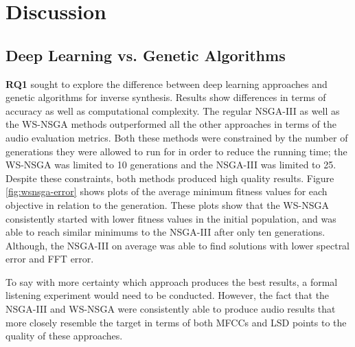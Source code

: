 \section{Discussion}
\label{sec:inverse-synth-discuss}

\subsection{Deep Learning vs. Genetic Algorithms}
\textbf{RQ1} sought to explore the difference between deep learning approaches and genetic algorithms for inverse synthesis. Results show differences in terms of accuracy as well as computational complexity. The regular NSGA-III as well as the WS-NSGA methods outperformed all the other approaches in terms of the audio evaluation metrics. Both these methods were constrained by the number of generations they were allowed to run for in order to reduce the running time; the WS-NSGA was limited to 10 generations and the NSGA-III was limited to 25. Despite these constraints, both methods produced high quality results. Figure \ref{fig:wsnsga-error} shows plots of the average minimum fitness values for each objective in relation to the generation. These plots show that the WS-NSGA consistently started with lower fitness values in the initial population, and was able to reach similar minimums to the NSGA-III after only ten generations. Although, the NSGA-III on average was able to find solutions with lower spectral error and FFT error.

To say with more certainty which approach produces the best results, a formal listening experiment would need to be conducted. However, the fact that the NSGA-III and WS-NSGA were consistently able to produce audio results that more closely resemble the target in terms of both MFCCs and LSD points to the quality of these approaches.

